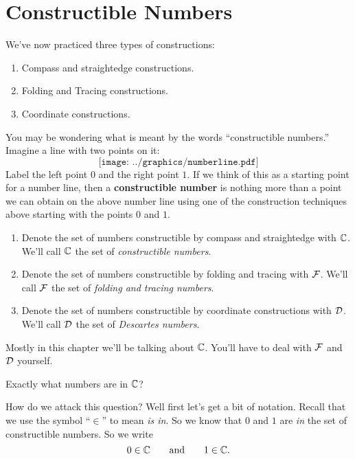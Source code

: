 \newpage







\section{Constructible Numbers}

We've now practiced three types of constructions:
\begin{enumerate}
\item Compass and straightedge constructions.
\item Folding and Tracing constructions.
\item Coordinate constructions.
\end{enumerate}
You may be wondering what is meant by the words ``constructible
numbers.'' Imagine a line with two points on it:
\[
\texttt{[image: ../graphics/numberline.pdf]}
\]
Label the left point $0$ and the right point $1$. If we think of this
as a starting point for a number line, then a \textbf{constructible
  number} is nothing more than a point we can obtain on the above
number line using one of the construction techniques above starting
with the points $0$ and $1$.  
\begin{enumerate}
\item Denote the set of numbers constructible by compass and
  straightedge with $\mathbb C$.
  We'll call $\mathbb C$ the set of \textit{constructible numbers}. 
\item Denote the set of numbers constructible by folding and tracing with
  $\mathcal F$. We'll call $\mathcal F$ the set
  of \textit{folding and tracing numbers}.
\item Denote the set of numbers constructible by coordinate
  constructions with $\mathcal D$. We'll
  call $\mathcal D$ the set of \textit{Descartes numbers}.
\end{enumerate}
Mostly in this chapter we'll be talking about $\mathbb C$. You'll have to
deal with $\mathcal F$ and $\mathcal D$ yourself.

\begin{question} Exactly what numbers are in $\mathbb C$?
\end{question}
\QM{}

How do we attack this question?  Well first let's get a bit of
notation. Recall that we use the symbol ``$\in$'' to mean \textit{is
  in}. So we know that $0$ and $1$ are \textit{in} the set of
constructible numbers. So we write
\[
0\in \mathbb C \qquad\text{and}\qquad 1\in\mathbb C.
\]

